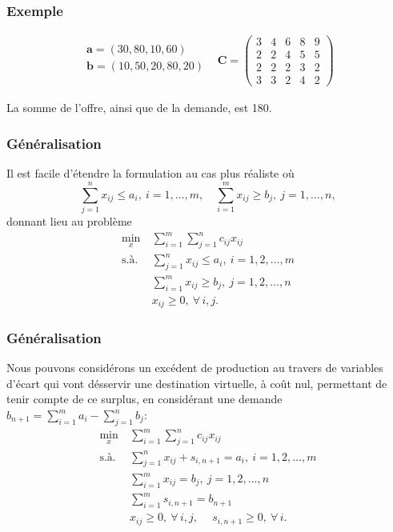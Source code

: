 \documentclass[usepdftitle=false]{beamer}
\def\ba{\boldsymbol{a}}
\def\bb{\boldsymbol{b}}
\def\bC{\boldsymbol{C}}
\begin{document}
\begin{frame}
\frametitle{Exemple}

\[
\begin{matrix}
\begin{matrix}
\ba = (30, 80, 10, 60) \\
\bb = (10, 50, 20, 80, 20) \\
\end{matrix}
&
\bC = 
\begin{pmatrix}
3 & 4 & 6 & 8 & 9 \\
2 & 2 & 4 & 5 & 5 \\
2 & 2 & 2 & 3 & 2 \\
3 & 3 & 2 & 4 & 2
\end{pmatrix}
\end{matrix}
\]

\mbox{}

La somme de l'offre, ainsi que de la demande, est 180.

\end{frame}

\begin{frame}
\frametitle{Généralisation}

Il est facile d'étendre la formulation au cas plus réaliste où
$$
\sum_{j = 1}^n x_{ij} \leq a_i,\ i = 1,\ldots,m, \quad
\sum_{i = 1}^m x_{ij} \geq b_j,\ j = 1,\ldots,n,
$$
donnant lieu au problème
\begin{align*}
	\min_x \ & \sum_{i = 1}^m \sum_{j = 1}^n c_{ij} x_{ij} \\
	\mbox{s.à. } & \sum_{j = 1}^n x_{ij} \leq a_i, \ i = 1,2,\ldots,m \\
	& \sum_{i = 1}^m x_{ij} \geq b_j,\ j = 1,2,\ldots,n \\
	& x_{ij} \geq 0,\ \forall\, i, j.
\end{align*}

\end{frame}

\begin{frame}
\frametitle{Généralisation}

Nous pouvons considérons un excédent de production au travers de variables d'écart qui vont désservir une destination virtuelle, à coût nul, permettant de tenir compte de ce surplus, en considérant une demande $b_{n+1} = \sum_{i = 1}^m a_i - \sum_{j = 1}^n b_j$:
\begin{align*}
	\min_x \ & \sum_{i = 1}^m \sum_{j = 1}^n c_{ij} x_{ij} \\
	\mbox{s.à. } & \sum_{j = 1}^n x_{ij} + s_{i,n+1} = a_i, \ i = 1,2,\ldots,m \\
	& \sum_{i = 1}^m x_{ij} = b_j,\ j = 1,2,\ldots,n \\
	& \sum_{i = 1}^m s_{i,n+1} = b_{n+1} \\
	& x_{ij} \geq 0,\ \forall\, i, j,\ \quad s_{i,n+1} \geq 0,\ \forall\, i.
\end{align*}

\end{frame}
\end{document}
